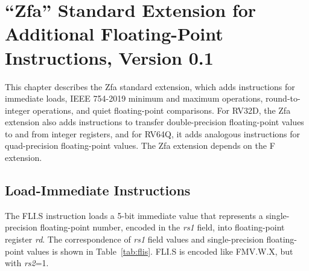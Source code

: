\chapter{``Zfa'' Standard Extension for Additional Floating-Point
Instructions, Version 0.1}
\label{chap:zfa}

This chapter describes the Zfa standard extension, which adds instructions for
immediate loads,
IEEE 754-2019 minimum and maximum operations,
round-to-integer operations,
and quiet floating-point comparisons.
For RV32D, the Zfa extension also adds instructions to transfer
double-precision floating-point values to and from integer registers, and for
RV64Q, it adds analogous instructions for quad-precision floating-point
values.
The Zfa extension depends on the F extension.


\section{Load-Immediate Instructions}

The FLI.S instruction loads a 5-bit immediate value that represents
a single-precision floating-point number, encoded in the {\em rs1} field, into
floating-point register {\em rd}.
The correspondence of {\em rs1} field values and single-precision
floating-point values is shown in Table~\ref{tab:flis}.
FLI.S is encoded like FMV.W.X, but with {\em rs2}=1.

